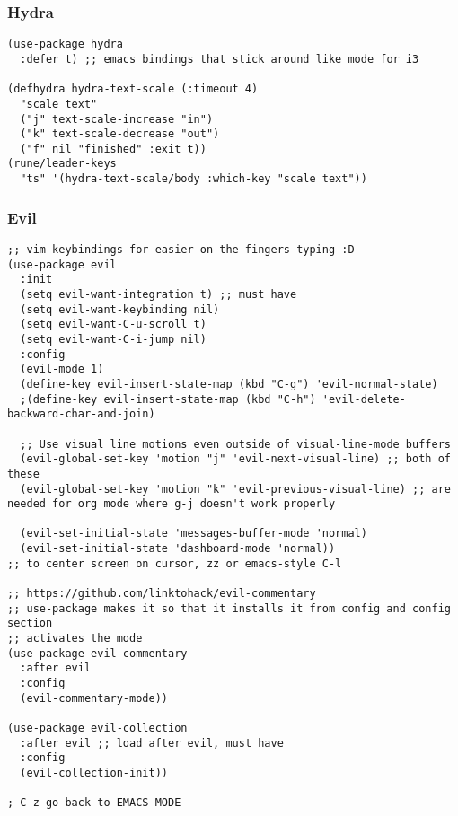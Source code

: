 \documentclass[11pt]{article}
\begin{document}
\subsubsection{Hydra}
\label{sec:orgfd40ec9}
\begin{verbatim}
(use-package hydra
  :defer t) ;; emacs bindings that stick around like mode for i3

(defhydra hydra-text-scale (:timeout 4)
  "scale text"
  ("j" text-scale-increase "in")
  ("k" text-scale-decrease "out")
  ("f" nil "finished" :exit t))
(rune/leader-keys
  "ts" '(hydra-text-scale/body :which-key "scale text"))

\end{verbatim}
\subsubsection{Evil}
\label{sec:org06e09af}
\begin{verbatim}
;; vim keybindings for easier on the fingers typing :D
(use-package evil
  :init
  (setq evil-want-integration t) ;; must have
  (setq evil-want-keybinding nil)
  (setq evil-want-C-u-scroll t)
  (setq evil-want-C-i-jump nil)
  :config
  (evil-mode 1)
  (define-key evil-insert-state-map (kbd "C-g") 'evil-normal-state)
  ;(define-key evil-insert-state-map (kbd "C-h") 'evil-delete-backward-char-and-join)

  ;; Use visual line motions even outside of visual-line-mode buffers
  (evil-global-set-key 'motion "j" 'evil-next-visual-line) ;; both of these
  (evil-global-set-key 'motion "k" 'evil-previous-visual-line) ;; are needed for org mode where g-j doesn't work properly

  (evil-set-initial-state 'messages-buffer-mode 'normal)
  (evil-set-initial-state 'dashboard-mode 'normal))
;; to center screen on cursor, zz or emacs-style C-l

;; https://github.com/linktohack/evil-commentary
;; use-package makes it so that it installs it from config and config section
;; activates the mode
(use-package evil-commentary
  :after evil
  :config
  (evil-commentary-mode))

(use-package evil-collection
  :after evil ;; load after evil, must have
  :config
  (evil-collection-init))

; C-z go back to EMACS MODE

\end{verbatim}
\end{document}
